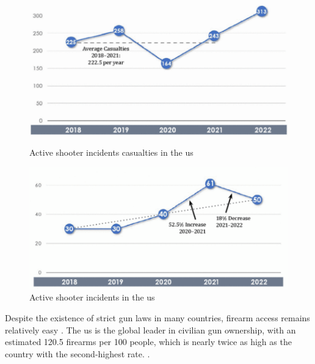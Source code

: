 \begin{figure}[h]
    \centering
    \begin{minipage}{0.42\textwidth}
        \centering
        \includegraphics[width=1\linewidth]{figs/active-shooter-incidents.png}
        \caption{Active shooter incidents casualties in the \ac{us} \cite{rfc37}}
        \label{fig:casualties}
    \end{minipage}\hfill
    \begin{minipage}{0.45\textwidth}
        \centering
        \includegraphics[width=1\linewidth]{figs/active-shooter-us.png}
        \caption{Active shooter incidents in the \ac{us} \cite{rfc37}}
        \label{fig:incidents}
    \end{minipage}
\end{figure}


Despite the existence of strict gun laws in many countries, firearm access remains relatively 
easy \cite{rfc39, rfc40}. The \ac{us} is the global leader in civilian gun 
ownership, with an estimated 120.5 firearms per 100 
people, which is nearly twice as high as the country with the second-highest rate.
\cite{rfc32}.

